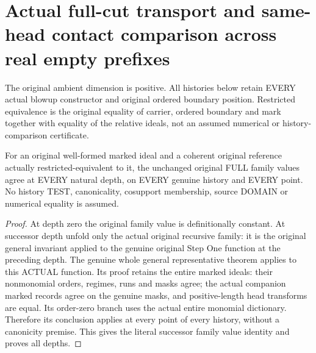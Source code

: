 \section{Actual full-cut transport and same-head contact comparison across real empty prefixes}

The original ambient dimension is positive. All histories below retain
EVERY actual blowup constructor and original ordered boundary position.
Restricted equivalence is the original equality of carrier, ordered
boundary and mark together with equality of the relative ideals, not an
assumed numerical or history-comparison certificate.

\begin{lemma}
\label{hir:original-all-history-restricted-equivalence-full-values}
\leanok
For an original well-formed marked ideal and a coherent original reference
actually restricted-equivalent to it, the unchanged original FULL family
values agree at EVERY natural depth, on EVERY genuine history and EVERY
point. No history TEST, canonicality, cosupport membership, source DOMAIN
or numerical equality is assumed.
\end{lemma}
\begin{proof}
At depth zero the original family value is definitionally constant. At
successor depth unfold only the actual original recursive family: it is
the original general invariant applied to the genuine original Step One
function at the preceding depth. The genuine whole general representative
theorem applies to this ACTUAL function. Its proof retains the entire
marked ideals: their nonmonomial orders, regimes, runs and masks agree;
the actual companion marked records agree on the genuine masks, and
positive-length head transforms are equal. Its order-zero branch uses
the actual entire monomial dictionary. Therefore its conclusion applies
at every point of every history, without a canonicity premise. This gives
the literal successor family value identity and proves all depths.
\end{proof}

